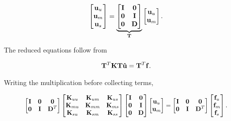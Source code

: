 \begin{equation}\label{rbe2-expanded-transformation-T}
    \begin{bmatrix}
        \mathbf{u}_u\\\mathbf{u}_m\\\mathbf{u}_s
    \end{bmatrix}
    =
    \underbrace{\begin{bmatrix}
        \mathbf{I}&\mathbf{0}\\
        \mathbf{0}&\mathbf{I}\\
        \mathbf{0}&\mathbf{D}
    \end{bmatrix}}_{\mathbf{T}}
    \begin{bmatrix}
        \mathbf{u}_u\\\mathbf{u}_m
    \end{bmatrix}.
\end{equation}

The reduced equations follow from

\begin{equation}
    \mathbf{T}^T\mathbf{K}\mathbf{T}\mathbf{\hat{u}}
    =\mathbf{T}^T\mathbf{f}.
\end{equation}

Writing the multiplication before collecting terms,

\begin{equation}
\scalebox{0.92}{$
\begin{bmatrix}
    \m{I}&\m{0}&\m{0}\\
    \m{0}&\m{I}&\m{D}^T
\end{bmatrix}
\begin{bmatrix}
    \m{K}_{uu}&\m{K}_{um}&\m{K}_{us}\\
    \m{K}_{mu}&\m{K}_{mm}&\m{K}_{ms}\\
    \m{K}_{su}&\m{K}_{sm}&\m{K}_{ss}
\end{bmatrix}
\begin{bmatrix}
    \m{I}&\m{0}\\
    \m{0}&\m{I}\\
    \m{0}&\m{D}
\end{bmatrix}
\begin{bmatrix}\m{u}_u\\\m{u}_m\end{bmatrix}
=
\begin{bmatrix}
    \m{I}&\m{0}&\m{0}\\
    \m{0}&\m{I}&\m{D}^T
\end{bmatrix}
\begin{bmatrix}\m{f}_u\\\m{f}_m\\\m{f}_s\end{bmatrix}.
$}
\end{equation}

